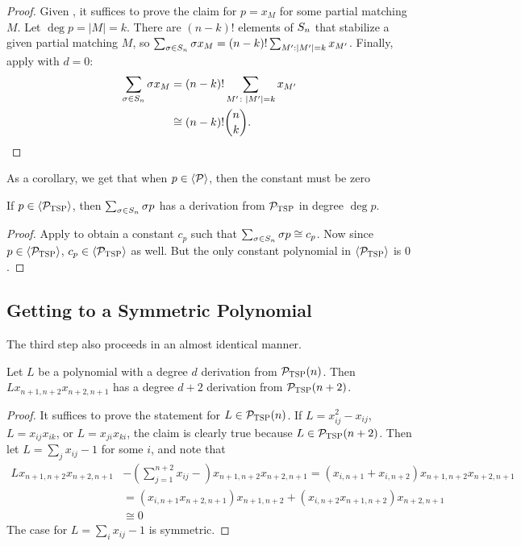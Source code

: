 \begin{proof}
Given ,
it suffices to prove the claim for
\(p = x_{M}\) for some partial matching \(M\).
Let $\deg p = |M| = k$.
There are $(n-k)!$ elements of $S_{n}$ that stabilize a given partial matching $M$, so
$\sum_{\sigma \in S_{n}} \sigma x_M = (n-k)!\sum_{M': |M'| = k} x_{M'}$.
Finally, apply  with $d = 0$:
\begin{equation*}
  \begin{split}
  \sum_{\sigma \in S_{n}} \sigma x_{M}
  &= (n-k)! \sum_{M' \colon \left|M'\right| = k} x_{M'} \\
  &\cong
  (n-k)!\binom{n}{k}.
  \end{split}
\end{equation*}
\end{proof}
As a corollary, we get that when $p \in \langle \mathcal P \rangle$, then the constant must be zero 
\begin{corollary}\label{cor:tsp-constantiszero}
If $p \in \langle \mathcal P_{\textsc{TSP}} \rangle$, then $\sum_{\sigma \in S_{n}} \sigma p$ has a derivation from $\mathcal P_{\textsc{TSP}}$ in degree $\deg p$.
\end{corollary}
\begin{proof}
Apply  to obtain a constant $c_p$ such that $\sum_{\sigma \in S_{n}} \sigma p \cong c_p$. 
Now since $p \in \langle \mathcal P_{\textsc{TSP}} \rangle$, $c_p \in \langle \mathcal P_{\textsc{TSP}} \rangle$ as well. But the only constant polynomial in $\langle \mathcal P_{\textsc{TSP}} \rangle$ is $0$.
\end{proof}

\subsection{Getting to a Symmetric Polynomial}
The third step also proceeds in an almost identical manner.
\begin{lemma}
  \label{lem:tsp-degree-increase}
  Let \(L\) be a polynomial with a degree $d$ derivation from $\mathcal P_{\textsc{TSP}}(n)$.
	Then $Lx_{n+1,n+2}x_{n+2,n+1}$ has a degree $d+2$ derivation from $\mathcal P_{\textsc{TSP}}(n+2)$.
\end{lemma}
\begin{proof}
It suffices to prove the statement for $L \in \mathcal P_{\textsc{TSP}}(n)$. 
If $L = x_{ij}^2 - x_{ij}$, $L = x_{ij}x_{ik}$, or $L = x_{ji}x_{ki}$, the claim is clearly true because $L \in \mathcal P_{\textsc{TSP}}(n+2)$.
Then let $L = \sum_j x_{ij} - 1$ for some $i$, and note that 
\begin{align*}
Lx_{n+1,n+2}x_{n+2,n+1} &- \left(\sum_{j=1}^{n+2} x_{ij} - \right)x_{n+1,n+2}x_{n+2,n+1} = \left(x_{i,n+1} + x_{i,n+2}\right)x_{n+1,n+2}x_{n+2,n+1} \\
&= \left(x_{i,n+1}x_{n+2,n+1}\right)x_{n+1,n+2} + \left(x_{i,n+2}x_{n+1,n+2}\right)x_{n+2,n+1} \\
&\cong 0
\end{align*}
The case for $L = \sum_i x_{ij} - 1$ is symmetric.
\end{proof}

